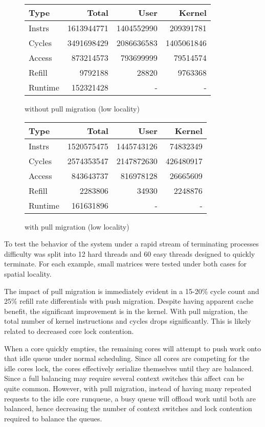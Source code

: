 \documentclass[11pt]{article}
\begin{document}
\begin{figure*}[!h]
\begin{subtable}{.48\textwidth}
\begin{tabular}{l|rrr}
			Type    & Total      & User       & Kernel     \\
			\hline
			Instrs  & 1613944771 & 1404552990 & 209391781  \\ 
			Cycles  & 3491698429 & 2086636583 & 1405061846 \\ 
			Access  & 873214573  & 793699999  & 79514574   \\ 
			Refill  & 9792188    & 28820      & 9763368    \\ 
			Runtime & 152321428  & -          & -          \\ 
			\hline
		\end{tabular}
		\caption{without pull migration (low locality)}
	\end{subtable}
	\hfill
	\begin{subtable}{.48\textwidth}
		\centering                 
		\begin{tabular}{l|rrr}  
			Type    & Total      & User       & Kernel    \\
			\hline
			Instrs  & 1520575475 & 1445743126 & 74832349  \\ 
			Cycles  & 2574353547 & 2147872630 & 426480917 \\ 
			Access  & 843643737  & 816978128  & 26665609  \\ 
			Refill  & 2283806    & 34930      & 2248876   \\ 
			Runtime & 161631896  & -          & -         \\ 
			\hline
		\end{tabular}
		\caption{with pull migration (low locality)}        
	\end{subtable}
\end{figure*}

To test the behavior of the system under a rapid stream of terminating processes difficulty was split into 12 hard threads and 60 easy threads designed to quickly terminate.  For each example, small matrices were tested under both cases for spatial locality.

The impact of pull migration is immediately evident in a 15-20\% cycle count and 25\% refill rate differentials with push migration.  Despite having apparent cache benefit, the significant improvement is in the kernel.  With pull migration, the total number of kernel instructions and cycles drops significantly.  This is likely related to decreased core lock contention.

When a core quickly empties, the remaining cores will attempt to push work onto that idle queue under normal scheduling.  Since all cores are competing for the idle cores lock, the cores effectively serialize themselves until they are balanced.  Since a full balancing may require several context switches this affect can be quite common.  However, with pull migration, instead of having many repeated requests to the idle core runqueue, a busy queue will offload work until both are balanced, hence decreasing the number of context switches and lock contention required to balance the queues.
\end{document}
